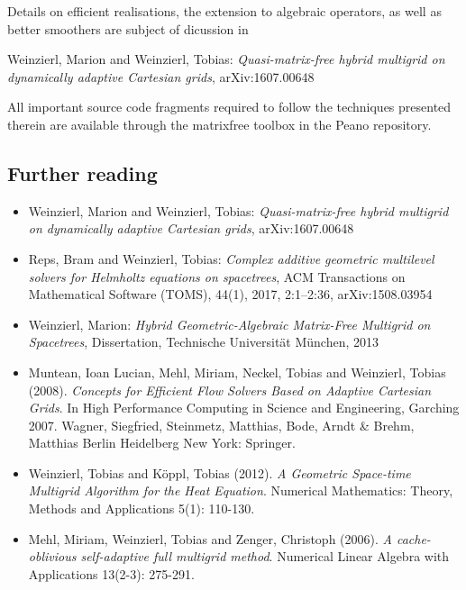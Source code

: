 Details on efficient realisations, the extension to algebraic operators,
as well as better smoothers are subject of dicussion in 

 \begin{framed} 
 \noindent
Weinzierl, Marion and Weinzierl, Tobias: {\em Quasi-matrix-free hybrid multigrid
on dynamically adaptive Cartesian grids}, arXiv:1607.00648
 \end{framed}
  
\noindent
All important source code fragments required to follow the techniques presented
therein are available through the matrixfree toolbox in the Peano repository.



\subsection*{Further reading}

\begin{itemize}
  \item Weinzierl, Marion and Weinzierl, Tobias: {\em Quasi-matrix-free hybrid
  multigrid on dynamically adaptive Cartesian grids}, arXiv:1607.00648
  \item  Reps, Bram and Weinzierl, Tobias: {\em Complex additive geometric
  multilevel solvers for Helmholtz equations on spacetrees}, ACM Transactions on
  Mathematical Software (TOMS), 44(1), 2017, 2:1--2:36, arXiv:1508.03954
  \item Weinzierl, Marion: {\em Hybrid Geometric-Algebraic Matrix-Free Multigrid on
Spacetrees}, Dissertation, Technische Universit\"at M\"unchen, 2013
  \item   Muntean, Ioan Lucian, Mehl, Miriam, Neckel, Tobias and Weinzierl,
  Tobias (2008). {\em Concepts for Efficient Flow Solvers Based on Adaptive
  Cartesian Grids}. In High Performance Computing in Science and Engineering, Garching 2007. Wagner, Siegfried, Steinmetz, Matthias, Bode, Arndt & Brehm, Matthias Berlin Heidelberg New York: Springer.
  \item Weinzierl, Tobias and K\"oppl, Tobias (2012). {\em A Geometric
  Space-time Multigrid Algorithm for the Heat Equation}. Numerical Mathematics:
  Theory, Methods and Applications 5(1): 110-130.
  \item Mehl, Miriam, Weinzierl, Tobias and Zenger, Christoph (2006). {\em A
  cache-oblivious self-adaptive full multigrid method}. Numerical Linear Algebra
  with Applications 13(2-3): 275-291.
\end{itemize}
